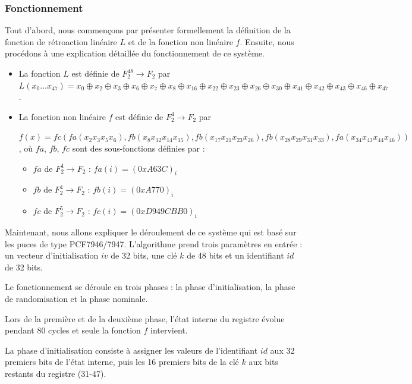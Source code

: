 \documentclass{template}
\begin{document}
\subsubsection{Fonctionnement}
\baselineskip=16pt

Tout d'abord, nous commençons par présenter formellement la définition de la fonction de rétroaction linéaire \(L\) et de la fonction non linéaire \(f\). Ensuite, nous procédons à une explication détaillée du fonctionnement de ce système.

\begin{itemize}
    \item La fonction \(L\) est définie de \(F_2^{48} \to F_2\) par \(L(x_0...x_{47}) = x_0 \oplus x_2 \oplus x_3 \oplus x_6 \oplus x_7 \oplus x_8 \oplus x_{16} \oplus x_{22} \oplus x_{23} \oplus x_{26} \oplus x_{30} \oplus x_{41} \oplus x_{42} \oplus x_{43} \oplus x_{46} \oplus x_{47}\).
    \item La fonction non linéaire \(f\) est définie de \(F_2^4 \to F_2\) par
    
    \(f(x) = fc(fa(x_{2}x_{3}x_{5}x_{6}), fb(x_{8}x_{12}x_{14}x_{15}), fb(x_{17}x_{21}x_{23}x_{26})
    ,fb(x_{28}x_{29}x_{31}x_{33}), fa(x_{34}x_{43}x_{44}x_{46}))\), où \(fa\), \(fb\), \(fc\) sont des sous-fonctions définies par :
    
    \begin{itemize}
        \item \(fa\) de \(F_2^4 \to F_2\) : \(fa(i)=(0xA63C)_i\)
        \item \(fb\) de \(F_2^4 \to F_2\) : \(fb(i)=(0xA770)_i\)
        \item \(fc\) de \(F_2^5 \to F_2\) : \(fc(i)=(0xD949CBB0)_i\)
    \end{itemize}
\end{itemize}
\baselineskip=16pt
Maintenant, nous allons expliquer le déroulement de ce système qui est basé sur les puces de type PCF7946/7947. L'algorithme prend trois paramètres en entrée : un vecteur d'initialisation \(iv\) de 32 bits, une clé \(k\) de 48 bits et un identifiant \(id\) de 32 bits.

Le fonctionnement se déroule en trois phases : la phase d'initialisation, la phase de randomisation et la phase nominale.

Lors de la première et de la deuxième phase, l'état interne du registre évolue pendant 80 cycles et seule la fonction \(f\) intervient.

La phase d'initialisation consiste à assigner les valeurs de l'identifiant \(id\) aux 32 premiers bits de l'état interne, puis les 16 premiers bits de la clé \(k\) aux bits restants du registre (31-47).
\end{document}
